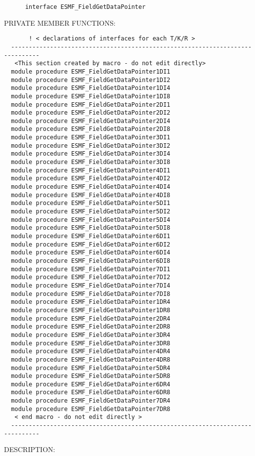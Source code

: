 \begin{verbatim}      interface ESMF_FieldGetDataPointer\end{verbatim}{\sf PRIVATE MEMBER FUNCTIONS:}
\begin{verbatim}       ! < declarations of interfaces for each T/K/R >
  ------------------------------------------------------------------------------ 
   <This section created by macro - do not edit directly> 
  module procedure ESMF_FieldGetDataPointer1DI1 
  module procedure ESMF_FieldGetDataPointer1DI2 
  module procedure ESMF_FieldGetDataPointer1DI4 
  module procedure ESMF_FieldGetDataPointer1DI8 
  module procedure ESMF_FieldGetDataPointer2DI1 
  module procedure ESMF_FieldGetDataPointer2DI2 
  module procedure ESMF_FieldGetDataPointer2DI4 
  module procedure ESMF_FieldGetDataPointer2DI8 
  module procedure ESMF_FieldGetDataPointer3DI1 
  module procedure ESMF_FieldGetDataPointer3DI2 
  module procedure ESMF_FieldGetDataPointer3DI4 
  module procedure ESMF_FieldGetDataPointer3DI8 
  module procedure ESMF_FieldGetDataPointer4DI1 
  module procedure ESMF_FieldGetDataPointer4DI2 
  module procedure ESMF_FieldGetDataPointer4DI4 
  module procedure ESMF_FieldGetDataPointer4DI8 
  module procedure ESMF_FieldGetDataPointer5DI1 
  module procedure ESMF_FieldGetDataPointer5DI2 
  module procedure ESMF_FieldGetDataPointer5DI4 
  module procedure ESMF_FieldGetDataPointer5DI8 
  module procedure ESMF_FieldGetDataPointer6DI1 
  module procedure ESMF_FieldGetDataPointer6DI2 
  module procedure ESMF_FieldGetDataPointer6DI4 
  module procedure ESMF_FieldGetDataPointer6DI8 
  module procedure ESMF_FieldGetDataPointer7DI1 
  module procedure ESMF_FieldGetDataPointer7DI2 
  module procedure ESMF_FieldGetDataPointer7DI4 
  module procedure ESMF_FieldGetDataPointer7DI8 
  module procedure ESMF_FieldGetDataPointer1DR4 
  module procedure ESMF_FieldGetDataPointer1DR8 
  module procedure ESMF_FieldGetDataPointer2DR4 
  module procedure ESMF_FieldGetDataPointer2DR8 
  module procedure ESMF_FieldGetDataPointer3DR4 
  module procedure ESMF_FieldGetDataPointer3DR8 
  module procedure ESMF_FieldGetDataPointer4DR4 
  module procedure ESMF_FieldGetDataPointer4DR8 
  module procedure ESMF_FieldGetDataPointer5DR4 
  module procedure ESMF_FieldGetDataPointer5DR8 
  module procedure ESMF_FieldGetDataPointer6DR4 
  module procedure ESMF_FieldGetDataPointer6DR8 
  module procedure ESMF_FieldGetDataPointer7DR4 
  module procedure ESMF_FieldGetDataPointer7DR8 
   < end macro - do not edit directly > 
  ------------------------------------------------------------------------------ 
 \end{verbatim}
{\sf DESCRIPTION:\\ }


